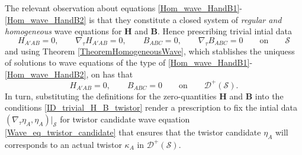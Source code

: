 \documentclass[10pt,a4paper]{article}
\theoremstyle{plain}
\def\bmB{{\bm B}}
\def\bmH{{\bm H}}
\begin{document}
{The relevant observation about equations
\eqref{Hom_wave_HandB1}-\eqref{Hom_wave_HandB2} is that they
constitute a closed system of \emph{regular and homogeneous}
wave equations for $\bmH$ and $\bmB$.
Hence prescribing trivial intial data
\[
H_{A'AB}=0, \qquad \nabla_\tau H_{A'AB}=0, \qquad B_{ABC}=0, \qquad \nabla_\tau B_{ABC}=0 \qquad \text{on} \qquad \mathcal{S}
\]
and using Theorem \ref{TheoremHomogeneousWave}, which stablishes the
uniquess of solutions to wave equations of the type
of \eqref{Hom_wave_HandB1}-\eqref{Hom_wave_HandB2}, on has that 
\begin{equation}\label{ID_trivial_H_B_twistor}
H_{A'AB}=0, \qquad B_{ABC}=0 \qquad \text{on} \qquad \mathcal{D}^{+}(\mathcal{S}) .
\end{equation}
In turn, substituting the definitions for the zero-quantities $\bmH$
and $\bmB$ into the conditions \eqref{ID_trivial_H_B_twistor} render a
prescription to fix the intial data $(\nabla_\tau \eta_A,
\eta_A)|_\mathcal{S}$ for  twistor
candidate wave equation \eqref{Wave_eq_twistor_candidate} that ensures that
 the twistor candidate $\eta_A$ will
corresponds to an actual twistor $\kappa_A$ in $\mathcal{D}^{+}(\mathcal{S})$.

}
\end{document}
